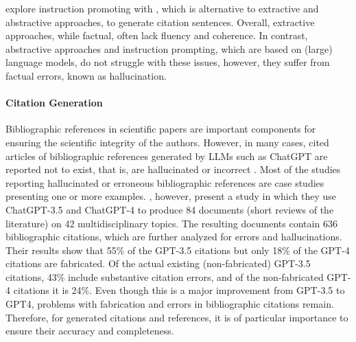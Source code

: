 explore 
instruction promoting with %
, 
which is alternative to extractive and abstractive approaches, to generate citation sentences.
Overall, 
extractive approaches, while factual, often lack fluency and coherence. In contrast, abstractive approaches and instruction prompting, which are based on (large) language models, do not struggle with these issues, however, they suffer from factual errors, known as hallucination. %
 


\paragraph{Citation Generation} %
Bibliographic references in scientific papers are important components for ensuring the scientific integrity of the authors. However, in many cases, cited articles of bibliographic references generated by LLMs such as ChatGPT are reported not to exist, that is, are hallucinated or incorrect \cite{li-ouyang-2024-related,huang2023citation,li2024citation,farhat2023trustworthy}. Most of the studies reporting hallucinated or erroneous bibliographic references are case studies presenting one or more examples. 
\citet{walters2023fabrication}, however, present a study in which they use ChatGPT-3.5 and ChatGPT-4 to produce 84 documents (short reviews of the literature) on 42 multidisciplinary topics. The resulting documents contain 636 bibliographic citations, which are further analyzed for errors and hallucinations. Their results show that 55\% of the GPT-3.5 citations but only 18\% of the GPT-4 citations are fabricated. Of the actual existing (non-fabricated) GPT-3.5 citations, 43\% include substantive citation errors, and of the non-fabricated GPT-4 citations it is 24\%. 
Even though this is a major improvement from GPT-3.5 to GPT4, problems with fabrication and errors in bibliographic citations remain. %
Therefore, for generated citations and references, it is of particular importance to ensure their accuracy and completeness. %


